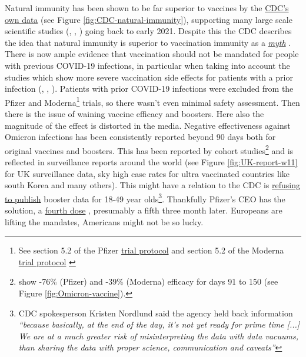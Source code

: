 \documentclass[11pt,a4paper,notitlepage]{report}
\begin{document}
Natural immunity has been shown to be far superior to vaccines by the \href{https://www.cdc.gov/mmwr/volumes/71/wr/mm7104e1.htm#F1_down}{CDC's own data} \cite{cdc28012020} (see Figure \ref{fig:CDC-natural-immunity}), supporting many large scale scientific studies (\cite{Gazit2021.08.24.21262415}, \cite{doi:10.1126/science.abf4063}, \cite{Goldberg2021.04.20.21255670}) going back to early 2021. Despite this the CDC describes the idea that natural immunity is superior to vaccination immunity as a \href{https://www.cdc.gov/coronavirus/2019-ncov/vaccines/facts.html}{\textit{myth}} \cite{cdc15122021} . There is now ample evidence that vaccination should not be mandated for people with previous COVID-19 infections, in particular when taking into account the studies which show more severe vaccination side effects for patients with a prior infection (\cite{Monforte2021}, \cite{LI20221082}, \cite{Raw22}). Patients with prior COVID-19 infections were excluded from the Pfizer and Moderna\footnote{See section 5.2 of the Pfizer \href{https://cdn.pfizer.com/pfizercom/2020-11/C4591001_Clinical_Protocol_Nov2020.pdf}{trial protocol} \cite{pfizer102020} and section 5.2 of the Moderna \href{https://www.modernatx.com/sites/default/files/mRNA-1273-P301-Protocol.pdf}{trial protocol} \cite{moderna102020}} trials, so there wasn't even minimal safety assessment. Then there is the issue of waining vaccine efficacy and boosters. Here also the magnitude of the effect is distorted in the media. Negative effectiveness against Omicron infections has been consistently reported beyond 90 days both for original vaccines and boosters. This has been reported by cohort studies\footnote{\citet{Hansen2021.12.20.21267966} show -76\% (Pfizer) and -39\% (Moderna) efficacy for days 91 to 150 (see Figure \ref{fig:Omicron-vaccine}).} and is reflected in surveillance reports around the world (see Figure \ref{fig:UK-report-w11} for UK surveillance data, sky high case rates for ultra vaccinated countries like south Korea and many others). This might have a relation to the CDC is \href{https://www.webmd.com/lung/news/20220222/report-cdc-not-publishing-large-amounts-of-covid-19-data}{refusing to publish} \cite{webmd22022022} booster data for 18-49 year olds\footnote{CDC spokesperson Kristen Nordlund said the agency held back information \textit{“because basically, at the end of the day, it’s not yet ready for prime time [...] We are at a much greater risk of misinterpreting the data with data vacuums, than sharing the data with proper science, communication and caveats”}}. Thankfully Pfizer's CEO has the solution, a \href{https://www.cbsnews.com/news/covid-vaccine-fourth-dose-booster-pfizer-ceo-albert-bourla/}{fourth dose} \cite{cbsnews14032022}, presumably a fifth three month later. Europeans are lifting the mandates, Americans might not be so lucky.
\end{document}
